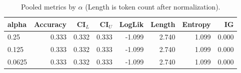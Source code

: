 \begin{table}[!htbp]\centering\small
\caption{Pooled metrics by $\alpha$ (Length is token count after normalization).}\label{tab:table1}
\begin{tabular}{lrrrrrrr}\toprule
alpha & Accuracy & CI$_{L}$ & CI$_{U}$ & LogLik & Length & Entropy & IG \\
\midrule
0.25 & 0.333 & 0.332 & 0.333 & -1.099 & 2.740 & 1.099 & 0.000 \\
0.125 & 0.333 & 0.332 & 0.333 & -1.099 & 2.740 & 1.099 & 0.000 \\
0.0625 & 0.333 & 0.332 & 0.333 & -1.099 & 2.740 & 1.099 & 0.000 \\
\bottomrule\end{tabular}\end{table}
